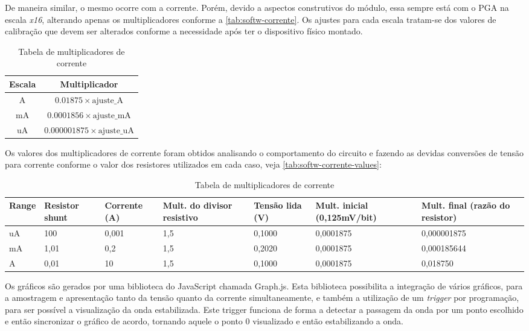 De maneira similar, o mesmo ocorre com a corrente. Porém, devido a aspectos construtivos do módulo, essa sempre está com o \gls{PGA} na escala \textit{x16}, alterando apenas os multiplicadores conforme a \autoref{tab:softw-corrente}.
Os ajustes para cada escala tratam-se dos valores de calibração que devem ser alterados conforme a necessidade após ter o dispositivo físico montado.

\begin{table}[h!]
    \centering
    \begin{tabular}{|c|c|}
    \hline
    \textbf{Escala} & \textbf{Multiplicador} \\
    \hline
    A & $0.01875 \times \text{ajuste\_A}$ \\
    mA & $0.0001856 \times \text{ajuste\_mA}$ \\
    uA & $0.000001875 \times \text{ajuste\_uA}$ \\
    \hline
    \end{tabular}
    \caption{Tabela de multiplicadores de corrente}
    \label{tab:softw-corrente}
\end{table}

Os valores dos multiplicadores de corrente foram obtidos analisando o comportamento do circuito e fazendo as devidas conversões de tensão para corrente conforme o valor dos resistores utilizados em cada caso, veja \autoref{tab:softw-corrente-values}:

\begin{table}[h!]
    \centering
    \begin{tabularx}{\textwidth}{|X|X|X|X|X|X|X|}
    \hline
    \textbf{Range} & \textbf{Resistor shunt} & \textbf{Corrente (A)} & \textbf{Mult. do divisor resistivo} & \textbf{Tensão lida (V)} & \textbf{Mult. inicial (0,125mV/bit)} & \textbf{Mult. final (razão do resistor)} \\
    \hline
    uA & 100 & 0,001 & 1,5 & 0,1000 & 0,0001875 & 0,000001875 \\
    mA & 1,01 & 0,2 & 1,5 & 0,2020 & 0,0001875 & 0,000185644 \\
    A & 0,01 & 10 & 1,5 & 0,1000 & 0,0001875 & 0,018750 \\
    \hline
    \end{tabularx}
    \caption{Tabela de multiplicadores de corrente}
    \label{tab:softw-corrente-values}
\end{table}

Os gráficos são gerados por uma biblioteca do JavaScript chamada Graph.js. Esta biblioteca possibilita a integração de vários gráficos, para a amostragem e apresentação tanto da tensão quanto da corrente simultaneamente, e também a utilização de um \textit{trigger} por programação, para ser possível a visualização da onda estabilizada. Este trigger funciona de forma a detectar a passagem da onda por um ponto escolhido e então sincronizar o gráfico de acordo, tornando aquele o ponto 0 visualizado e então estabilizando a onda.


